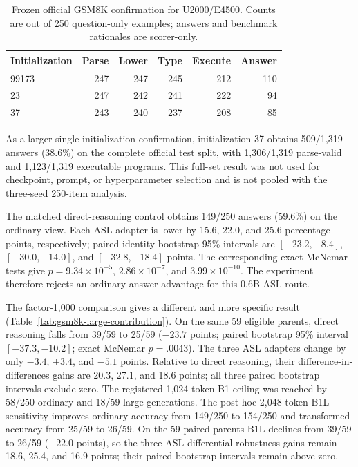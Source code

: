 \documentclass[11pt]{article}
\begin{document}
\begin{table}[t]
\centering\small
\caption{Frozen official GSM8K confirmation for U2000/E4500. Counts are out of
250 question-only examples; answers and benchmark rationales are scorer-only.}
\label{tab:gsm8k-official-confirmation}
\begin{tabular}{lrrrrr}
\toprule
Initialization & Parse & Lower & Type & Execute & Answer\\
\midrule
99173 & 247 & 247 & 245 & 212 & 110\\
23    & 247 & 242 & 241 & 222 & 94\\
37    & 243 & 240 & 237 & 208 & 85\\
\bottomrule
\end{tabular}
\end{table}

As a larger single-initialization confirmation, initialization 37 obtains
509/1,319 answers (38.6\%) on the complete official test split, with 1,306/1,319
parse-valid and 1,123/1,319 executable programs. This full-set result was not
used for checkpoint, prompt, or hyperparameter selection and is not pooled with
the three-seed 250-item analysis.

The matched direct-reasoning control obtains 149/250 answers (59.6\%) on the
ordinary view. Each ASL adapter is lower by 15.6, 22.0, and 25.6 percentage
points, respectively; paired identity-bootstrap 95\% intervals are
$[-23.2,-8.4]$, $[-30.0,-14.0]$, and $[-32.8,-18.4]$ points. The corresponding
exact McNemar tests give $p=9.34\times10^{-5}$, $2.86\times10^{-7}$, and
$3.99\times10^{-10}$. The experiment therefore rejects an ordinary-answer
advantage for this 0.6B ASL route.

The factor-1,000 comparison gives a different and more specific result
(Table~\ref{tab:gsm8k-large-contribution}). On the same 59 eligible parents,
direct reasoning falls from 39/59 to 25/59 ($-23.7$ points; paired bootstrap
95\% interval $[-37.3,-10.2]$; exact McNemar $p=.0043$). The three ASL adapters
change by only $-3.4$, $+3.4$, and $-5.1$ points. Relative to direct reasoning,
their difference-in-differences gains are 20.3, 27.1, and 18.6 points; all three
paired bootstrap intervals exclude zero. The registered 1,024-token B1 ceiling
was reached by 58/250 ordinary and 18/59 large generations. The post-hoc
2,048-token B1L sensitivity improves ordinary accuracy from 149/250 to 154/250
and transformed accuracy from 25/59 to 26/59. On the 59 paired parents B1L
declines from 39/59 to 26/59 ($-22.0$ points), so the three ASL differential
robustness gains remain 18.6, 25.4, and 16.9 points; their paired bootstrap
intervals remain above zero.
\end{document}
